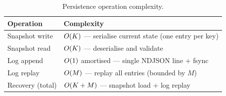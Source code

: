 \begin{table}[H]
\centering
\caption{Persistence operation complexity.}
\label{tab:persistence-complexity}
\begin{tabular}{@{}ll@{}}
\toprule
\textbf{Operation} & \textbf{Complexity} \\
\midrule
Snapshot write     & $O\!\left(K\right)$ — serialise current state (one entry per key) \\
Snapshot read      & $O\!\left(K\right)$ — deserialise and validate \\
Log append         & $O\!\left(1\right)$ amortised — single NDJSON line + fsync \\
Log replay         & $O\!\left(M\right)$ — replay all entries (bounded by $M$) \\
Recovery (total)   & $O\!\left(K + M\right)$ — snapshot load + log replay \\
\bottomrule
\end{tabular}
\end{table}
